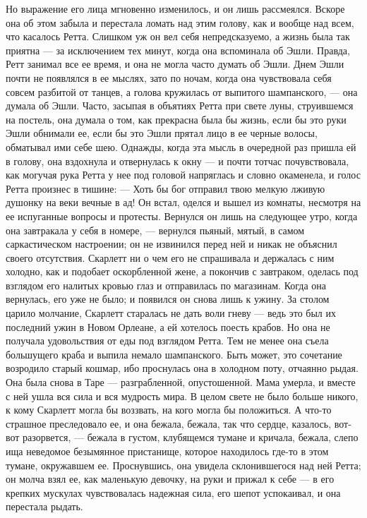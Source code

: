 Но выражение его лица мгновенно изменилось, и он лишь рассмеялся. Вскоре она об этом забыла и перестала ломать над этим голову, как и вообще над всем, что касалось Ретта. Слишком уж он вел себя непредсказуемо, а жизнь была так приятна — за исключением тех минут, когда она вспоминала об Эшли.
Правда, Ретт занимал все ее время, и она не могла часто думать об Эшли. Днем Эшли почти не появлялся в ее мыслях, зато по ночам, когда она чувствовала себя совсем разбитой от танцев, а голова кружилась от выпитого шампанского, — она думала об Эшли. Часто, засыпая в объятиях Ретта при свете луны, струившемся на постель, она думала о том, как прекрасна была бы жизнь, если бы это руки Эшли обнимали ее, если бы это Эшли прятал лицо в ее черные волосы, обматывал ими себе шею.
Однажды, когда эта мысль в очередной раз пришла ей в голову, она вздохнула и отвернулась к окну — и почти тотчас почувствовала, как могучая рука Ретта у нее под головой напряглась и словно окаменела, и голос Ретта произнес в тишине:
— Хоть бы бог отправил твою мелкую лживую душонку на веки вечные в ад!
Он встал, оделся и вышел из комнаты, несмотря на ее испуганные вопросы и протесты. Вернулся он лишь на следующее утро, когда она завтракала у себя в номере, — вернулся пьяный, мятый, в самом саркастическом настроении; он не извинился перед ней и никак не объяснил своего отсутствия.
Скарлетт ни о чем его не спрашивала и держалась с ним холодно, как и подобает оскорбленной жене, а покончив с завтраком, оделась под взглядом его налитых кровью глаз и отправилась по магазинам. Когда она вернулась, его уже не было; и появился он снова лишь к ужину.
За столом царило молчание, Скарлетт старалась не дать воли гневу — ведь это был их последний ужин в Новом Орлеане, а ей хотелось поесть крабов. Но она не получала удовольствия от еды под взглядом Ретта. Тем не менее она съела большущего краба и выпила немало шампанского. Быть может, это сочетание возродило старый кошмар, ибо проснулась она в холодном поту, отчаянно рыдая. Она была снова в Таре — разграбленной, опустошенной. Мама умерла, и вместе с ней ушла вся сила и вся мудрость мира. В целом свете не было больше никого, к кому Скарлетт могла бы воззвать, на кого могла бы положиться. А что-то страшное преследовало ее, и она бежала, бежала, так что сердце, казалось, вот-вот разорвется, — бежала в густом, клубящемся тумане и кричала, бежала, слепо ища неведомое безымянное пристанище, которое находилось где-то в этом тумане, окружавшем ее.
Проснувшись, она увидела склонившегося над ней Ретта; он молча взял ее, как маленькую девочку, на руки и прижал к себе — в его крепких мускулах чувствовалась надежная сила, его шепот успокаивал, и она перестала рыдать.
